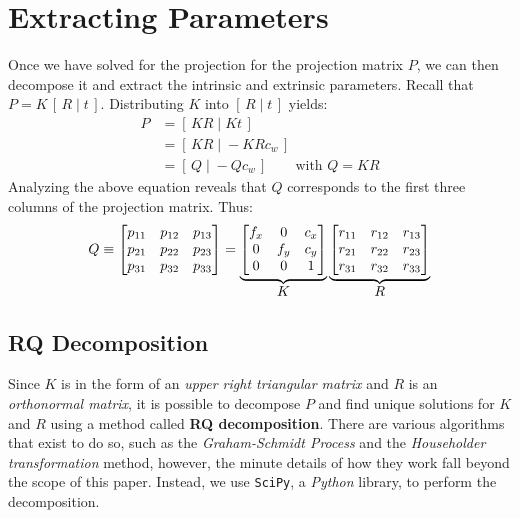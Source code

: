 \section{Extracting Parameters} \label{sec:extract}

Once we have solved for the projection for the projection matrix $P$, we can then decompose it and extract the intrinsic and extrinsic parameters. Recall that $P = K\,[\,R\;|\;t\,]$. Distributing $K$ into $[\,R\;|\;t\,]$ yields:
\begin{align} \label{eq:param}
    P & = [\,KR\;|\;Kt\,]     \nonumber                     \\
      & = [\,KR\;|\;-KRc_w\,]  \nonumber                    \\
      & = [\,Q\;|\;-Qc_w\,]      \qquad \text{with } Q = KR
\end{align}
Analyzing the above equation reveals that $Q$ corresponds to the first three columns of the projection matrix. Thus:
\begin{equation*}
    Q \equiv
    \begin{bmatrix}
        p_{11} & p_{12} & p_{13} \\
        p_{21} & p_{22} & p_{23} \\
        p_{31} & p_{32} & p_{33}
    \end{bmatrix}
    =
    \underbrace{
        \begin{bmatrix}
            f_x & 0   & c_x \\
            0   & f_y & c_y \\
            0   & 0   & 1
        \end{bmatrix}
    }_{\mathlarger{K}}
    \underbrace{
        \begin{bmatrix}
            r_{11} & r_{12} & r_{13} \\
            r_{21} & r_{22} & r_{23} \\
            r_{31} & r_{32} & r_{33} \\
        \end{bmatrix}
    }_{\mathlarger{R}}
\end{equation*}

\subsection{RQ Decomposition} \label{subsec:rq}
Since $K$ is in the form of an \emph{upper right triangular matrix} and $R$ is an \emph{orthonormal matrix}, it is possible to decompose $P$ and find unique solutions for $K$ and $R$ using a method called \textbf{RQ decomposition}. There are various algorithms that exist to do so, such as the \emph{Graham-Schmidt Process} and the \emph{Householder transformation} method, however, the minute details of how they work fall beyond the scope of this paper. Instead, we use \texttt{SciPy}, a \emph{Python} library, to perform the decomposition.

